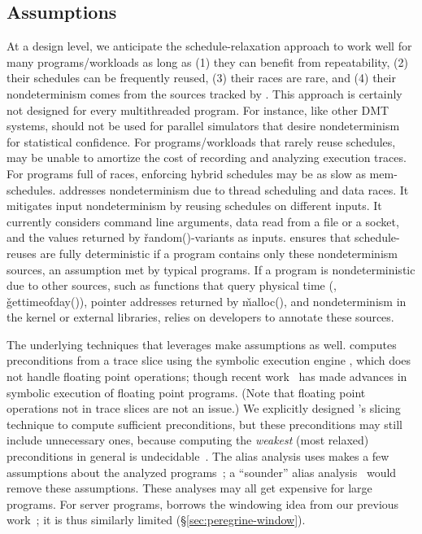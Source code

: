 \subsection{Assumptions} \label{sec:peregrine-limitations}

At a design level, we anticipate the schedule-relaxation approach to work
well for many programs/workloads as long as (1) they can benefit from
repeatability, (2) their schedules can be frequently reused, (3) their
races are rare, and (4) their nondeterminism comes from the sources
tracked by \peregrine.  This approach is certainly not designed for every
multithreaded program. For instance, like other DMT systems, \peregrine should
not be used for parallel simulators that desire nondeterminism for
statistical confidence.  For programs/workloads that rarely reuse
schedules, \peregrine may be unable to amortize the cost of recording and
analyzing execution traces.  For programs full of races, enforcing hybrid
schedules may be as slow as mem-schedules.  \peregrine addresses nondeterminism
due to thread scheduling and data races.  It mitigates input
nondeterminism by reusing schedules on different inputs.  It currently
considers command line arguments, data read from a file or a socket, and
the values returned by \v{random()}-variants as inputs.  \peregrine ensures that
schedule-reuses are fully deterministic if a program contains only these
nondeterminism sources, an assumption met by typical programs.  If a
program is nondeterministic due to other sources, such as functions that
query physical time (\eg, \v{gettimeofday()}), pointer addresses returned
by \v{malloc()}, and nondeterminism in the kernel or external libraries,
\peregrine relies on developers to annotate these sources.


The underlying techniques that \peregrine leverages make assumptions as well.
\peregrine computes preconditions from a trace slice using the symbolic
execution engine \klee, which does not handle floating point operations;
though recent work~\cite{klee-fp} has made advances in symbolic execution
of floating point programs.  (Note
that floating point operations not in trace slices are not an issue.)  We
explicitly designed \peregrine's slicing technique to compute sufficient
preconditions, but these preconditions may still include unnecessary ones,
because computing the \emph{weakest} (most relaxed) preconditions in general is
undecidable~\cite{aho:dragon:06}.  The alias analysis \peregrine uses makes a
few assumptions about the analyzed programs~\cite{alias:icse05};
a ``sounder'' alias analysis~\cite{alias:fse06} would remove these
assumptions.  These analyses may all get expensive for large
programs.  For server programs, \peregrine borrows the
windowing idea from our previous work~\cite{cui:tern:osdi10}; it is thus
similarly limited (\S\ref{sec:peregrine-window}).

